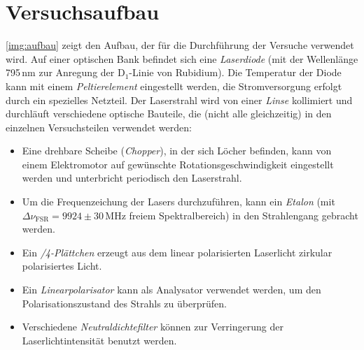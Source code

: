 \section{Versuchsaufbau}
\autoref{img:aufbau} zeigt den Aufbau, der für die Durchführung der Versuche
verwendet wird.
Auf einer optischen Bank befindet sich eine \emph{Laserdiode} (mit der Wellenlänge
795\,nm zur Anregung der D$_1$-Linie von Rubidium).
Die Temperatur der Diode kann mit einem \emph{Peltierelement} eingestellt werden,
die Stromversorgung erfolgt durch ein spezielles Netzteil.
Der Laserstrahl wird von einer \emph{Linse} kollimiert und durchläuft verschiedene
optische Bauteile, die (nicht alle gleichzeitig) in den einzelnen Versuchsteilen
verwendet werden:
\begin{itemize}
    \item Eine drehbare Scheibe (\emph{Chopper}), in der sich Löcher befinden, kann von
    einem Elektromotor auf gewünschte Rotationsgeschwindigkeit eingestellt werden und unterbricht periodisch
    den Laserstrahl.
    \item Um die Fre\-quenz\-eich\-ung der Lasers durchzuführen, kann ein \emph{Etalon}
    (mit $\Delta \nu_\text{FSR} = 9924 \pm 30$\,MHz freiem Spektralbereich) in den Strahlengang gebracht werden.
    \item Ein \emph{\textlambda/4-Plättchen} erzeugt aus dem linear polarisierten Laserlicht zirkular polarisiertes Licht.
    \item Ein \emph{Linearpolarisator} kann als Analysator verwendet werden, um den Polarisationszustand
    des Strahls zu überprüfen.
    \item Verschiedene \emph{Neutraldichtefilter} können zur Verringerung der Laserlichtintensität benutzt werden.
\end{itemize}

